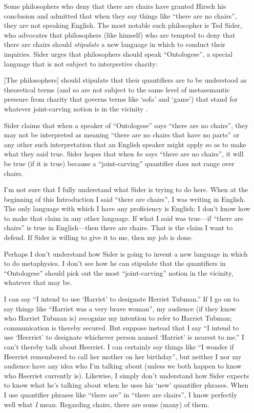 \documentclass[11pt]{article}
\newenvironment{squote}{%
\begin{spacing}{1}
       	\begin{list}{}{%
\setlength{\labelwidth}{0pt}%
\rightmargin\leftmargin%
}
\item\relax
}{%
\end{list}%
\end{spacing}
}
\begin{document}
\begin{spacing}{1.25}
Some philosophers who deny that there are chairs have granted Hirsch
his conclusion and admitted that when they say things like ``there are
no chairs'', they are not speaking English.  The most notable such
philosopher is Ted Sider, who advocates that philosophers (like
himself) who are tempted to deny that there are chairs should {\em
  stipulate} a new language in which to conduct their inquiries.
Sider urges that philosophers should speak ``Ontologese'', a special
language that is not subject to interpretive charity:

\begin{squote}
{[}The philosophers{]} should stipulate that their quantifiers are to be
understood as theoretical terms (and so are not subject to the same
level of metasemantic pressure from charity that governs terms like
`sofa' and `game') that stand for whatever joint-carving notion is in
the vicinity \citeyearpar[9]{sider2011b}.
\end{squote}

Sider claims that when a speaker of ``Ontologese'' says ``there are no
chairs'', they may not be interpreted as meaning ``there are no chairs
that have no parts'' or any other such interpretation that an English
speaker might apply so as to make what they said true.  Sider hopes
that when {\em he} says ``there are no chairs'', it will be true (if
it is true) because a ``joint-carving'' quantifier does not range over
chairs.

I'm not sure that I fully understand what Sider is trying to do here.
When at the beginning of this Introduction I said ``there are
chairs'', I was writing in English.  The only language with which I
have any proficiency is English; I don't know how to make that claim
in any other language.  If what I said was true---if ``there are
chairs'' is true in English---then there are chairs.  That is the
claim I want to defend.  If Sider is willing to give it to me, then my
job is done.

Perhaps I don't understand how Sider is going to invent a new language
in which to do metaphysics.  I don't see how he can stipulate that the
quantifiers in ``Ontologese'' should pick out the most
``joint-carving'' notion in the vicinity, whatever that may be.  

I can say ``I intend to use `Harriet' to designate Herriet Tubman.''
If I go on to say things like ``Harriet was a very brave woman'', my
audience (if they know who Harriet Tubman is) recognize my intention
to refer to Harriet Tubman; communication is thereby secured.  But
suppose instead that I say ``I intend to use `Heerriet' to designate
whichever person named `Harriet' is nearest to me.''  I can't thereby
talk about Heerriet.  I can certainly say things like ``I wonder if
Heerriet remembered to call her mother on her birthday'', but neither
I nor my audience have any idea who I'm talking about (unless we both
happen to know who Heerriet currently is).  Likewise, I simply don't
understand how Sider expects to know what he's talking about when he
uses his `new' quantifier phrases.  When I use quantifier phrases like
``there are'' in ``there are chairs'', I know perfectly well what {\em
  I} mean.  Regarding chairs, there are some (many) of them.


\end{spacing}
\end{document}
